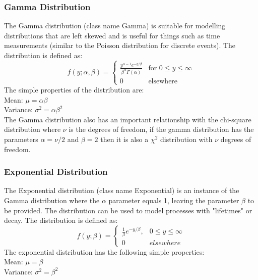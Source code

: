 \documentclass[a4paper]{article}
\begin{document}
\subsubsection*{Gamma Distribution}
The Gamma distribution (class name Gamma) is suitable for modelling distributions that are left skewed and is useful for things such as time measurements (similar to the Poisson distribution for discrete events). The distribution is defined as:
\[
f(y; \alpha, \beta) = 
	\begin{cases}
		\frac{ y^{\alpha - 1}e^{-y/\beta} }{ \beta^{\alpha} \Gamma(\alpha) } & \text{for } 0 \le y \le \infty \\
		0 & \text{elsewhere}
	\end{cases}
\]
The simple properties of the distribution are:\\
Mean: $\mu = \alpha\beta$\\
Variance: $\sigma^2 = \alpha\beta^2$\\
The Gamma distribution also has an important relationship with the chi-square distribution where $\nu$ is the degrees of freedom, if the gamma distribution has the parameters $\alpha = \nu/2$ and $\beta = 2$ then it is also a $\chi^2$ distribution with $\nu$ degrees of freedom. \\
\subsubsection*{Exponential Distribution}
The Exponential distribution (class name Exponential) is an instance of the Gamma distribution where the $\alpha$ parameter equals 1, leaving the parameter $\beta$ to be provided. The distribution can be used to model processes with "lifetimes" or decay. The distribution is defined as:
\[
f(y; \beta) =
	\begin{cases}
		\frac{1}{\beta} e^{-y/\beta}, & 0 \le y \le \infty\\
		0 & elsewhere
	\end{cases}
\]
The exponential distribution has the following simple properties:\\
Mean: $\mu = \beta$\\
Variance: $\sigma^2 = \beta^2$
\end{document}
